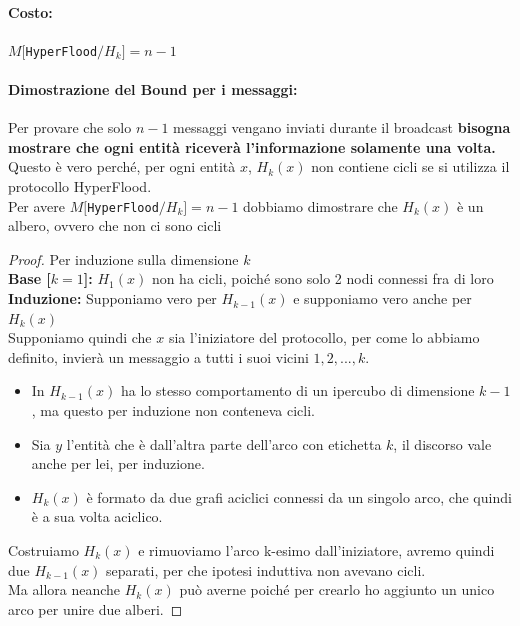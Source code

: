 \paragraph{Costo:}

\begin{center}
    $M[$\texttt{HyperFlood}$ / H_k] = n - 1$\\
\end{center}

\paragraph{Dimostrazione del Bound per i messaggi:}
Per provare che solo $n-1$ messaggi vengano inviati durante il broadcast
\textbf{bisogna mostrare che ogni entità riceverà l'informazione solamente una
    volta.} Questo è vero perché, per ogni entità $x$, $H_k(x)$ non contiene cicli
se si utilizza il protocollo HyperFlood.\\
Per avere $M[$\texttt{HyperFlood}$ / H_k] = n -1$ dobbiamo dimostrare che
$H_k(x)$ è un albero, ovvero che non ci sono cicli
\begin{proof}
    Per induzione sulla dimensione $k$\\
    \textbf{Base [$k=1$]: }$H_1(x)$ non ha cicli, poiché sono solo 2 nodi connessi
    fra di loro \\
    \textbf{Induzione: } Supponiamo vero per $H_{k-1}(x)$ e supponiamo vero anche
    per $H_k(x)$ \\
    Supponiamo quindi che $x$ sia l'iniziatore del protocollo, per come lo abbiamo
    definito, invierà un messaggio a tutti i suoi vicini $1, 2, ..., k$.
    \begin{itemize}
        \item In $H_{k-1}(x)$ ha lo stesso comportamento di un ipercubo di
              dimensione $k-1$, ma questo per induzione non conteneva cicli.
        \item Sia $y$ l'entità che è dall'altra parte dell'arco con etichetta $k$,
              il discorso vale anche per lei, per induzione.
        \item  $H_{k}(x)$ è formato da due grafi aciclici connessi da un singolo
              arco, che quindi è a sua volta aciclico.
    \end{itemize}

    Costruiamo $H_k(x)$ e rimuoviamo l'arco k-esimo dall'iniziatore, avremo quindi
    due $H_{k-1}(x)$ separati, per che ipotesi induttiva non avevano cicli.\\
    Ma allora neanche $H_k(x)$ può averne poiché per crearlo ho aggiunto un unico
    arco per unire due alberi.
\end{proof}

